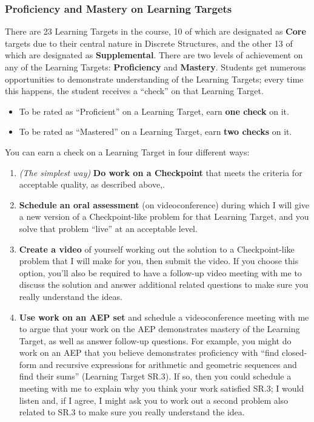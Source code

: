 \documentclass[]{article}
\providecommand{\tightlist}{%
  \setlength{\itemsep}{0pt}\setlength{\parskip}{0pt}}
\begin{document}
\hypertarget{proficiency-and-mastery-on-learning-targets}{%
\subsubsection{Proficiency and Mastery on Learning
Targets}\label{proficiency-and-mastery-on-learning-targets}}

There are 23 Learning Targets in the course, 10 of which are designated
as \textbf{Core} targets due to their central nature in Discrete
Structures, and the other 13 of which are designated as
\textbf{Supplemental}. There are two levels of achievement on any of the
Learning Targets: \textbf{Proficiency} and \textbf{Mastery}. Students
get numerous opportunities to demonstrate understanding of the Learning
Targets; every time this happens, the student receives a ``check'' on
that Learning Target.

\begin{itemize}
\tightlist
\item
  To be rated as ``Proficient'' on a Learning Target, earn \textbf{one
  check} on it.
\item
  To be rated as ``Mastered'' on a Learning Target, earn \textbf{two
  checks} on it.
\end{itemize}

You can earn a check on a Learning Target in four different ways:

\begin{enumerate}
\def\labelenumi{\arabic{enumi}.}
\tightlist
\item
  \emph{(The simplest way)} \textbf{Do work on a Checkpoint} that meets
  the criteria for acceptable quality, as described above,.
\item
  \textbf{Schedule an oral assessment} (on videoconference) during which
  I will give a new version of a Checkpoint-like problem for that
  Learning Target, and you solve that problem ``live'' at an acceptable
  level.
\item
  \textbf{Create a video} of yourself working out the solution to a
  Checkpoint-like problem that I will make for you, then submit the
  video. If you choose this option, you'll also be required to have a
  follow-up video meeting with me to discuss the solution and answer
  additional related questions to make sure you really understand the
  ideas.
\item
  \textbf{Use work on an AEP set} and schedule a videoconference meeting
  with me to argue that your work on the AEP demonstrates mastery of the
  Learning Target, as well as answer follow-up questions. For example,
  you might do work on an AEP that you believe demonstrates proficiency
  with ``find closed-form and recursive expressions for arithmetic and
  geometric sequences and find their sums'' (Learning Target SR.3). If
  so, then you could schedule a meeting with me to explain why you think
  your work satisfied SR.3; I would listen and, if I agree, I might ask
  you to work out a second problem also related to SR.3 to make sure you
  really understand the idea.
\end{enumerate}
\end{document}
